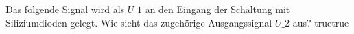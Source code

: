     {Das folgende Signal wird als $U\_1$ an den Eingang der Schaltung mit Siliziumdioden gelegt. Wie sieht das zugehörige Ausgangssignal $U\_2$ aus?}
    {}
    {}
    {}
    {}
    {true}{true}